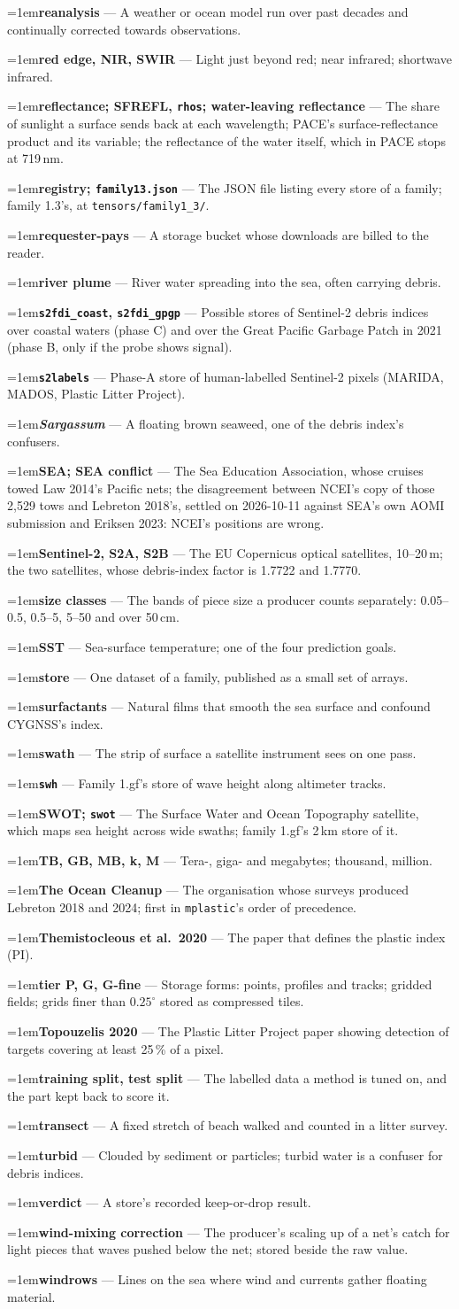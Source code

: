 \documentclass[10pt]{article}
\newcommand{\code}[1]{\texttt{#1}}
\newcommand{\gl}[2]{\par\hangindent=1em\hangafter=1\textbf{#1} --- #2\par}
\begin{document}
\gl{reanalysis}{A weather or ocean model run over past decades and continually corrected towards observations.}
\gl{red edge, NIR, SWIR}{Light just beyond red; near infrared; shortwave infrared.}
\gl{reflectance; SFREFL, \code{rhos}; water-leaving reflectance}{The share of sunlight a surface sends back at each wavelength; PACE's surface-reflectance product and its variable; the reflectance of the water itself, which in PACE stops at 719\,nm.}
\gl{registry; \code{family13.json}}{The JSON file listing every store of a family; family 1.3's, at \code{tensors/family1\_3/}.}
\gl{requester-pays}{A storage bucket whose downloads are billed to the reader.}
\gl{river plume}{River water spreading into the sea, often carrying debris.}
\gl{\code{s2fdi\_coast}, \code{s2fdi\_gpgp}}{Possible stores of Sentinel-2 debris indices over coastal waters (phase C) and over the Great Pacific Garbage Patch in 2021 (phase B, only if the probe shows signal).}
\gl{\code{s2labels}}{Phase-A store of human-labelled Sentinel-2 pixels (MARIDA, MADOS, Plastic Litter Project).}
\gl{\emph{Sargassum}}{A floating brown seaweed, one of the debris index's confusers.}
\gl{SEA; SEA conflict}{The Sea Education Association, whose cruises towed Law 2014's Pacific nets; the disagreement between NCEI's copy of those 2,529 tows and Lebreton 2018's, settled on 2026-10-11 against SEA's own AOMI submission and Eriksen 2023: NCEI's positions are wrong.}
\gl{Sentinel-2, S2A, S2B}{The EU Copernicus optical satellites, 10--20\,m; the two satellites, whose debris-index factor is 1.7722 and 1.7770.}
\gl{size classes}{The bands of piece size a producer counts separately: 0.05--0.5, 0.5--5, 5--50 and over 50\,cm.}
\gl{SST}{Sea-surface temperature; one of the four prediction goals.}
\gl{store}{One dataset of a family, published as a small set of arrays.}
\gl{surfactants}{Natural films that smooth the sea surface and confound CYGNSS's index.}
\gl{swath}{The strip of surface a satellite instrument sees on one pass.}
\gl{\code{swh}}{Family 1.gf's store of wave height along altimeter tracks.}
\gl{SWOT; \code{swot}}{The Surface Water and Ocean Topography satellite, which maps sea height across wide swaths; family 1.gf's 2\,km store of it.}
\gl{TB, GB, MB, k, M}{Tera-, giga- and megabytes; thousand, million.}
\gl{The Ocean Cleanup}{The organisation whose surveys produced Lebreton 2018 and 2024; first in \code{mplastic}'s order of precedence.}
\gl{Themistocleous et al.\ 2020}{The paper that defines the plastic index (PI).}
\gl{tier P, G, G-fine}{Storage forms: points, profiles and tracks; gridded fields; grids finer than $0.25^\circ$ stored as compressed tiles.}
\gl{Topouzelis 2020}{The Plastic Litter Project paper showing detection of targets covering at least 25\,\% of a pixel.}
\gl{training split, test split}{The labelled data a method is tuned on, and the part kept back to score it.}
\gl{transect}{A fixed stretch of beach walked and counted in a litter survey.}
\gl{turbid}{Clouded by sediment or particles; turbid water is a confuser for debris indices.}
\gl{verdict}{A store's recorded keep-or-drop result.}
\gl{wind-mixing correction}{The producer's scaling up of a net's catch for light pieces that waves pushed below the net; stored beside the raw value.}
\gl{windrows}{Lines on the sea where wind and currents gather floating material.}
\normalsize
\end{document}
